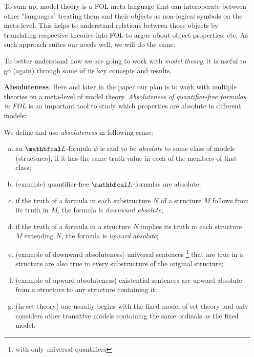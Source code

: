 To sum up, model theory is a FOL meta language that can interoperate between other "languages" treating them and their objects as non-logical symbols on the meta-level. This helps to understand relations between those objects by translating respective theories into FOL to argue about object properties, etc. As such approach suites our needs well, we will do the same.

To better understand how we are going to work with \textit{model theory}, it is useful to go (again) through some of its key concepts and results.

\textbf{Absoluteness}. Here and later in the paper our plan is to work with multiple theories on a meta-level of model theory. \textit{Absoluteness of quantifier-free formulas in FOL} is an important tool to study which properties are absolute in different models:

\begin{definition} 
We define and use \textit{absoluteness} in following sense:
\begin{enumerate}[(a)]
  \item an $\lsign$-formula $\phi$ is said to be \textit{absolute} to some class of models (structures), if it has the same truth value in each of the members of that class;
  \item (example) quantifier-free $\lsign$-formulas are absolute;
  \item if the truth of a formula in each substructure $N$ of a structure $M$ follows from its truth in $M$, the formula is \textit{downward absolute};
  \item if the truth of a formula in a structure $N$ implies its truth in each structure $M$ extending $N$, the formula is \textit{upward absolute};
  \item (example of downward absoluteness) universal sentences \footnote{with only universal quantifiers} that are true in a structure are also true in every substructure of the original structure;
  \item (example of upward absoluteness) existential sentences are upward absolute from a structure to any structure containing it;
  \item (in set theory) one usually begins with the fixed model of set theory and only considers other transitive models containing the same ordinals as the fixed model.
\end{enumerate}
\end{definition}

